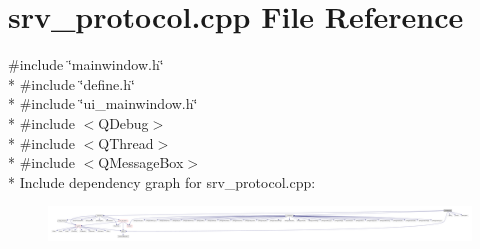 \hypertarget{a00136}{\section{srv\+\_\+protocol.\+cpp File Reference}
\label{a00136}
}
{\ttfamily \#include \char`\"{}mainwindow.\+h\char`\"{}}\\*
{\ttfamily \#include \char`\"{}define.\+h\char`\"{}}\\*
{\ttfamily \#include \char`\"{}ui\+\_\+mainwindow.\+h\char`\"{}}\\*
{\ttfamily \#include $<$Q\+Debug$>$}\\*
{\ttfamily \#include $<$Q\+Thread$>$}\\*
{\ttfamily \#include $<$Q\+Message\+Box$>$}\\*
Include dependency graph for srv\+\_\+protocol.\+cpp\+:
\nopagebreak
\begin{figure}[H]
\begin{center}
\leavevmode
\includegraphics[width=350pt]{d0/dc3/a00354}
\end{center}
\end{figure}

